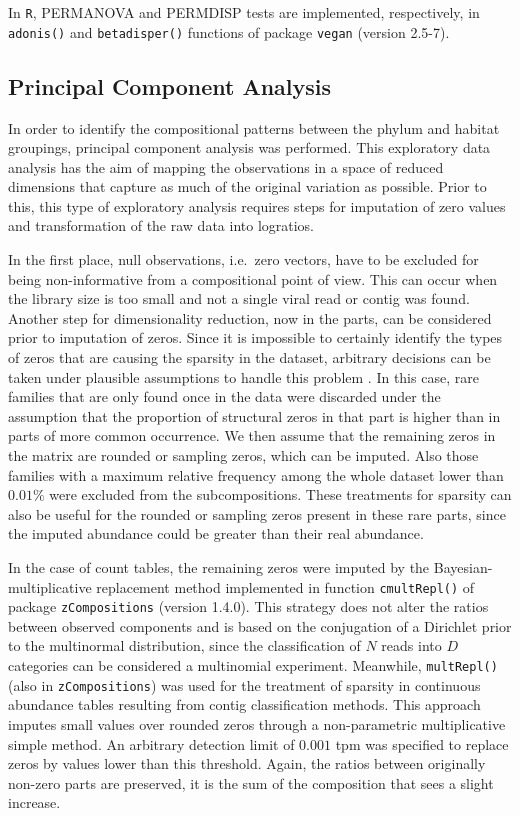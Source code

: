 \documentclass[
  openany]{book}
\begin{document}
In \texttt{R}, PERMANOVA and PERMDISP tests are implemented, respectively, in \texttt{adonis()} and \texttt{betadisper()} functions of package \texttt{vegan} (version 2.5-7).

\hypertarget{principal-component-analysis}{%
\subsection{Principal Component Analysis}\label{principal-component-analysis}}

In order to identify the compositional patterns between the phylum and habitat groupings, principal component analysis was performed. This exploratory data analysis has the aim of mapping the observations in a space of reduced dimensions that capture as much of the original variation as possible. Prior to this, this type of exploratory analysis requires steps for imputation of zero values and transformation of the raw data into logratios.

In the first place, null observations, i.e.~zero vectors, have to be excluded for being non-informative from a compositional point of view. This can occur when the library size is too small and not a single viral read or contig was found. Another step for dimensionality reduction, now in the parts, can be considered prior to imputation of zeros. Since it is impossible to certainly identify the types of zeros that are causing the sparsity in the dataset, arbitrary decisions can be taken under plausible assumptions to handle this problem \autocite{Xia2018b}. In this case, rare families that are only found once in the data were discarded under the assumption that the proportion of structural zeros in that part is higher than in parts of more common occurrence. We then assume that the remaining zeros in the matrix are rounded or sampling zeros, which can be imputed. Also those families with a maximum relative frequency among the whole dataset lower than \(0.01\%\) were excluded from the subcompositions. These treatments for sparsity can also be useful for the rounded or sampling zeros present in these rare parts, since the imputed abundance could be greater than their real abundance.

In the case of count tables, the remaining zeros were imputed by the Bayesian-multiplicative replacement method \autocite{Martin-Fernandez2014} implemented in function \texttt{cmultRepl()} of package \texttt{zCompositions} (version 1.4.0). This strategy does not alter the ratios between observed components and is based on the conjugation of a Dirichlet prior to the multinormal distribution, since the classification of \(N\) reads into \(D\) categories can be considered a multinomial experiment. Meanwhile, \texttt{multRepl()} (also in \texttt{zCompositions}) was used for the treatment of sparsity in continuous abundance tables resulting from contig classification methods. This approach imputes small values over rounded zeros through a non-parametric multiplicative simple method. An arbitrary detection limit of \(0.001\) tpm was specified to replace zeros by values lower than this threshold. Again, the ratios between originally non-zero parts are preserved, it is the sum of the composition that sees a slight increase.
\end{document}
